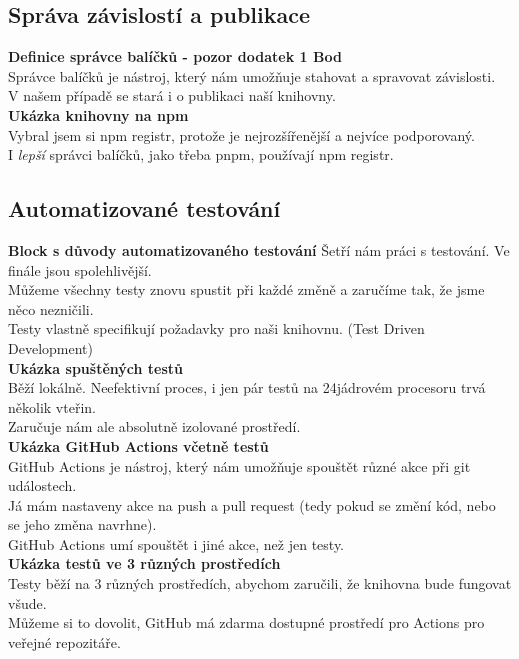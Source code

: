 {  \subsection {Správa závislostí a publikace}
  \textbf{Definice správce balíčků - pozor dodatek 1 Bod} \\
  Správce balíčků je nástroj, který nám umožňuje stahovat a spravovat závislosti. \\
  V našem případě se stará i o publikaci naší knihovny. \\
  \textbf{Ukázka knihovny na npm} \\
  Vybral jsem si npm registr, protože je nejrozšířenější a nejvíce podporovaný. \\
  I \textit{lepší} správci balíčků, jako třeba pnpm, používají npm registr. \\
  \pagebreak
  \subsection {Automatizované testování}
  \textbf{Block s důvody automatizovaného testování}
  Šetří nám práci s testování. Ve finále jsou spolehlivější. \\
  Můžeme všechny testy znovu spustit při každé změně a zaručíme tak, že jsme něco nezničili. \\
  Testy vlastně specifikují požadavky pro naši knihovnu. (Test Driven Development) \\
  \textbf{Ukázka spuštěných testů} \\
  Běží lokálně. Neefektivní proces, i jen pár testů na 24jádrovém procesoru trvá několik vteřin. \\
  Zaručuje nám ale absolutně izolované prostředí. \\
  \textbf{Ukázka GitHub Actions včetně testů} \\
  GitHub Actions je nástroj, který nám umožňuje spouštět různé akce při git událostech. \\
  Já mám nastaveny akce na push a pull request (tedy pokud se změní kód, nebo se jeho změna navrhne). \\
  GitHub Actions umí spouštět i jiné akce, než jen testy. \\
  \textbf{Ukázka testů ve 3 různých prostředích} \\
  Testy běží na 3 různých prostředích, abychom zaručili, že knihovna bude fungovat všude. \\
  Můžeme si to dovolit, GitHub má zdarma dostupné prostředí pro Actions pro veřejné repozitáře. \\
}
